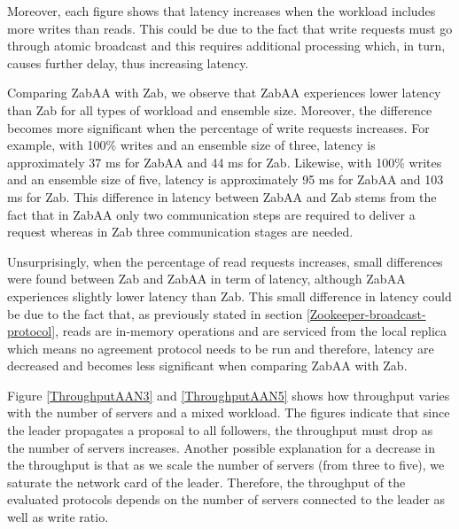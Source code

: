 \documentclass[a4paper,UKenglish]{oasics-v2016}
\begin{document}
Moreover, each figure shows that latency increases when the workload includes more writes than reads. This could be due to the fact that write requests must go through atomic broadcast and this requires additional processing which, in turn, causes further delay, thus increasing latency.




Comparing ZabAA with Zab, we observe that ZabAA experiences lower latency than Zab for all types of workload and ensemble size. Moreover, the difference becomes more significant when the percentage of write requests increases. For example, with 100\% writes and an ensemble size of three, latency is approximately 37 ms for ZabAA and 44 ms for Zab. Likewise, with 100\% writes and an ensemble size of five, latency is approximately 95 ms for ZabAA and 103 ms for Zab. This difference in latency between ZabAA and Zab stems from the fact that in ZabAA only two communication steps are required to deliver a request whereas in Zab three communication stages are needed. 

Unsurprisingly, when the percentage of read requests increases, small differences were found between Zab and ZabAA in term of latency, although ZabAA experiences slightly lower latency than Zab. This small difference in latency could be due to the fact that, as previously stated in section \ref{Zookeeper-broadcast-protocol}, reads are in-memory operations and are serviced from the local replica which means no agreement protocol needs to be run and therefore, latency are decreased and becomes less significant when comparing ZabAA with Zab.   


Figure \ref{ThroughputAAN3} and  \ref{ThroughputAAN5} shows how throughput varies with the number of servers and a mixed workload. The figures indicate that since the leader propagates a proposal to all followers, the throughput must drop as the number of servers increases. Another possible explanation for a decrease in the throughput is that as we scale the number of servers (from three to five), we saturate the network card of the leader. Therefore, the throughput of the evaluated protocols depends on the number of servers connected to the leader as well as write ratio.
\end{document}
